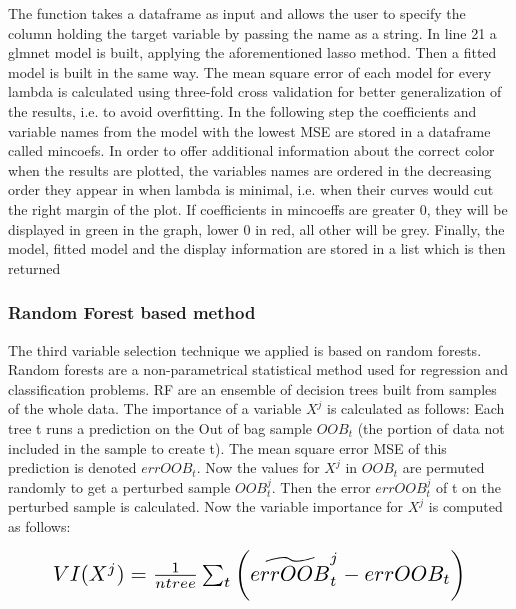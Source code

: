 \documentclass[11pt]{article}
\begin{document}
The function takes a dataframe as input and allows the user to specify the column holding the target variable by passing the name as a string.
In line 21 a glmnet model is built, applying the aforementioned lasso method.
Then a fitted model is built in the same way. The mean square error of each model for every lambda is calculated using three-fold cross validation for better generalization of the results, i.e. to avoid overfitting.
In the following step the coefficients and variable names from the model with the lowest MSE are stored in a dataframe called mincoefs. In order to offer additional information about the correct color when the results are plotted, the variables names are ordered in the decreasing order they appear in when lambda is minimal, i.e. when their curves would cut the right margin of the plot. If coefficients in mincoeffs are greater 0, they will be displayed in green in the graph, lower 0 in red, all other will be grey.
Finally, the model, fitted model and the display information are stored in a list which is then returned



\subsubsection{Random Forest based method}

The third variable selection technique we applied is based on random forests.
Random forests are a non-parametrical statistical method used for regression and classification problems. RF are an ensemble of decision trees built from samples of the whole data. The importance of a variable $X^j$ is calculated as follows: Each tree t runs a prediction on the Out of bag sample $OOB_{t}$ (the portion of data not included in the sample to create t). The mean square error MSE of this prediction is denoted $errOOB_{t}$. Now the values for $X^j$ in $OOB_{t}$ are permuted randomly to get a perturbed sample ${OOB}^j_{t}$. Then the error ${errOOB}^j_{t}$ of t on the perturbed sample is calculated. Now the variable importance for $X^j$ is computed as follows:
\begin{center}  \[ \scalebox{1.5} {$VI(X^j)=\frac{1}{ntree}\sum_{t}\left ( \widetilde{errOOB}^j_{t} - errOOB_{t} \right )$}\] \end{center}
\end{document}
